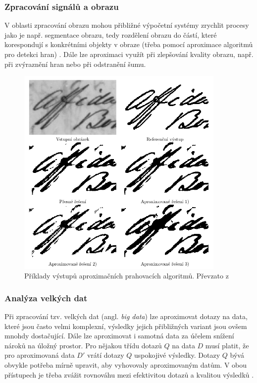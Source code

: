 \subsubsection{Zpracování signálů a obrazu}
V oblasti zpracování obrazu mohou přibližné výpočetní systémy zrychlit procesy jako je např. segmentace obrazu, tedy rozdělení obrazu do částí, které korespondují s konkrétními objekty v obraze (třeba pomocí aproximace algoritmů pro detekci hran) \cite{segmentation_tech}. Dále lze aproximaci využít při zlepšování kvality obrazu, např. při zvýraznění hran nebo při odstranění šumu.

\begin{figure}[H]
    \centering
    \includegraphics[width=0.9\textwidth]{obrazky-figures/approx_thresholding.png}
    \caption{Příklady výstupů aproximačních prahovacích algoritmů. Převzato z \cite{approx_image}}
    \label{fig:approx_threshold}
\end{figure}

\subsubsection{Analýza velkých dat}
Při zpracování tzv. velkých dat (angl. \textit{big data}) lze aproximovat dotazy na data, které jsou často velmi komplexní, výsledky jejich přibližných variant jsou ovšem mnohdy dostačující. Dále lze aproximovat i samotná data za účelem snížení nároků na úložný prostor. Pro nějakou třídu dotazů $Q$ na data $D$ musí platit, že pro aproximovaná data $D'$ vrátí dotazy $Q$ uspokojivé výsledky. Dotazy $Q$ bývá obvykle potřeba mírně upravit, aby vyhovovaly aproximovaným datům. V obou přístupech je třeba zvážit rovnováhu mezi efektivitou dotazů a kvalitou výsledků \cite{approx_big_data}.

